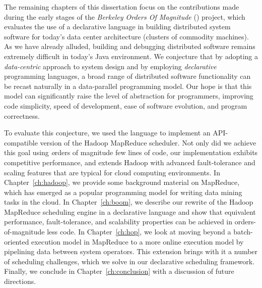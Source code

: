 The remaining chapters of this dissertation focus on the contributions made
during the early stages of the {\em Berkeley Orders Of Magnitude} (\BOOM)
project, which evaluates the use of a declarative language in building
distributed system software for today's data center architecture (clusters of
commodity machines).  As we have already alluded, building and debugging
distributed software remains extremely difficult in today's Java environment.
We conjecture that by adopting a \emph{data-centric} approach to system design
and by employing \emph{declarative} programming languages, a broad range of
distributed software functionality can be recast naturally in a data-parallel
programming model.  Our hope is that this model can significantly raise the
level of abstraction for programmers, improving code simplicity, speed of
development, ease of software evolution, and program correctness.

To evaluate this conjecture, we used the \OVERLOG language to implement an
API-compatible version of the Hadoop MapReduce scheduler.  Not only did we
achieve this goal using {\emph orders of magnitude} few lines of code, our
implementation exhibits competitive performance, and extends Hadoop with
advanced fault-tolerance and scaling features that are typical for cloud
computing environments.  In Chapter~\ref{ch:hadoop}, we provide some background
material on MapReduce, which has emerged as a popular programming model for
writing data mining tasks in the cloud.  In Chapter~\ref{ch:boom}, we describe
our rewrite of the Hadoop MapReduce scheduling engine in a declarative language
and show that equivalent performance, fault-tolerance, and scalability
properties can be achieved in orders-of-magnitude less code.  In
Chapter~\ref{ch:hop}, we look at moving beyond a batch-oriented execution model
in MapReduce to a more online execution model by pipelining data between system
operators.  This extension brings with it a number of scheduling challenges,
which we solve in our declarative scheduling framework.  Finally, we conclude
in Chapter~\ref{ch:conclusion} with a discussion of future directions.




